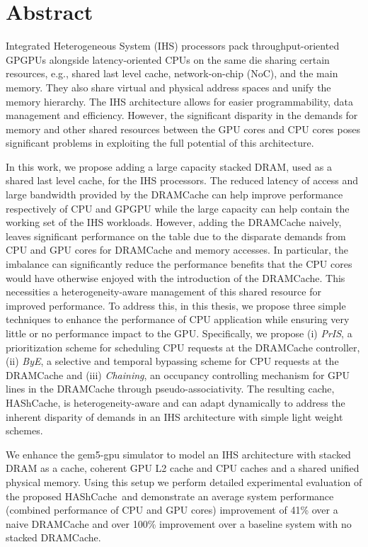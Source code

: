 \documentclass[12pt,a4paper]{report}
\newcommand{\cachename}{HAShCache}
\newcommand{\bypassname}{\textit{ByE}}
\newcommand{\prioname}{\textit{PrIS}}
\newcommand{\chaining}{\textit{Chaining}}
\begin{document}
\section*{Abstract}

\par Integrated Heterogeneous System (IHS) processors pack throughput-oriented GPGPUs alongside latency-oriented CPUs on the same die sharing certain resources, e.g., shared last level cache, network-on-chip (NoC), and the main memory. They also share virtual and physical address spaces and unify the memory hierarchy. The IHS architecture allows for easier programmability, data management and efficiency. However, the significant disparity in the demands for memory and other shared resources between the GPU cores and CPU cores poses significant problems in exploiting the full potential of this architecture.
\par In this work, we propose adding a large capacity stacked DRAM, used as a shared last level cache, for the IHS processors. The reduced latency of access and large bandwidth provided by the DRAMCache can help improve performance respectively of CPU and GPGPU while the large capacity can help contain the working set of the IHS workloads. However, adding the DRAMCache naively, leaves significant performance on the table due to the disparate demands from CPU and GPU cores for DRAMCache and memory accesses. 
In particular, the imbalance can significantly reduce the performance benefits that the CPU cores would have otherwise enjoyed with the introduction of the DRAMCache. This necessities a heterogeneity-aware management of this shared resource for improved performance. To address this, in this thesis, we propose three simple techniques to enhance the performance of CPU application while ensuring very little or no performance impact to the GPU. Specifically, we propose (i) \prioname, a prioritization scheme for scheduling CPU
requests at the DRAMCache controller, (ii) \bypassname, a selective and temporal bypassing scheme for CPU requests at the DRAMCache and (iii) \chaining, an occupancy controlling mechanism for GPU lines in the DRAMCache through pseudo-associativity. The resulting cache, \cachename, is heterogeneity-aware and can adapt dynamically to address the inherent disparity of demands in an IHS architecture with simple light weight schemes. 
\par We enhance the gem5-gpu simulator to model an IHS architecture with stacked DRAM as a cache, coherent GPU L2 cache and CPU caches and a shared unified physical memory. Using this setup we perform detailed experimental evaluation of the proposed \cachename\ and demonstrate an average system performance (combined performance of CPU  and GPU cores) improvement of 41\% over a naive DRAMCache and over 100\% improvement over a baseline system with no stacked DRAMCache.
\end{document}
